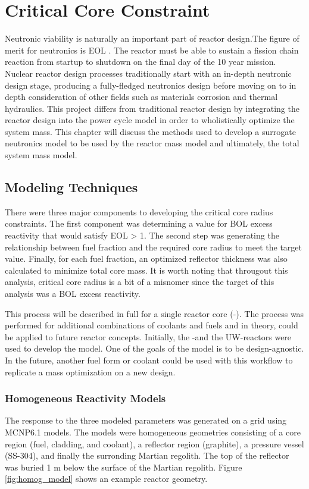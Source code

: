 \chapter{Critical Core Constraint}\label{ch:crit_radius}

Neutronic viability is naturally an important part of reactor design.The figure of merit
for neutronics is EOL \keff. The reactor must be able to sustain a fission
chain reaction from startup to shutdown on the final day of the 10 year
mission. Nuclear reactor design processes traditionally start with an in-depth
neutronic design stage, producing a fully-fledged neutronics design before
moving on to in depth consideration of other fields such as materials corrosion
and thermal hydraulics. This project differs from traditional reactor design by
integrating the reactor design into the power cycle model in order to
wholistically optimize the system mass. This chapter will discuss the methods
used to develop a surrogate neutronics model to be used by the reactor mass
model and ultimately, the total system mass model.

\section{Modeling Techniques}
There were three major components to developing the critical core radius
constraints. The first component was determining a value for BOL excess reactivity that would satisfy
EOL \keff > 1. The second step was generating the relationship between fuel fraction and the
required core radius to meet the target \keff value. Finally, for each fuel fraction, an
optimized reflector thickness was also calculated to minimize total core mass.
It is worth noting that througout this analysis, critical core radius is a
bit of a misnomer since the target of this analysis was a BOL excess
reactivity.

This process will be described in full for a single reactor core (\uox-\codiox). The process
was performed for additional combinations of coolants and fuels and in theory,
could be applied to future reactor concepts. Initially, the \uox-\codiox and the
UW-\codiox reactors were used to develop the model. One of the goals of the
model is to be design-agnostic. In the future, another fuel form or coolant could be used
with this workflow to replicate a mass optimization on a new design.

\subsection{Homogeneous Reactivity Models}
The \keff response to the three modeled parameters was generated on a grid using
MCNP6.1 models. The models were homogeneous geometries consisting of
a core region (fuel, cladding, and coolant), a reflector region (graphite), a
pressure vessel (SS-304), and finally the surronding Martian regolith. The top of the
reflector was buried 1 m below the surface of the Martian regolith. Figure
\ref{fig:homog_model} shows an example reactor geometry.

